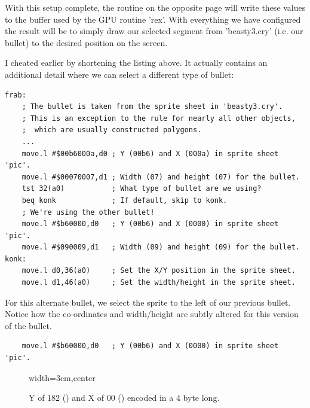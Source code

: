 With this setup complete, the routine  on the opposite page will write these
values to the buffer used by the GPU routine 'rex'. With everything we have configured the result
will be to simply draw our selected segment from 'beasty3.cry' (i.e. our bullet) to the desired position on the screen.

I cheated earlier by shortening the  listing above. It actually contains an additional detail
where we can select a different type of bullet:
\begin{lstlisting}
frab:
    ; The bullet is taken from the sprite sheet in 'beasty3.cry'.
    ; This is an exception to the rule for nearly all other objects,
    ;  which are usually constructed polygons.
    ...
    move.l #$00b6000a,d0 ; Y (00b6) and X (000a) in sprite sheet 'pic'.
    move.l #$00070007,d1 ; Width (07) and height (07) for the bullet.
    tst 32(a0)           ; What type of bullet are we using?
    beq konk             ; If default, skip to konk.
    ; We're using the other bullet!
    move.l #$b60000,d0   ; Y (00b6) and X (0000) in sprite sheet 'pic'.
    move.l #$090009,d1   ; Width (09) and height (09) for the bullet.
konk:
    move.l d0,36(a0)     ; Set the X/Y position in the sprite sheet.
    move.l d1,46(a0)     ; Set the width/height in the sprite sheet.
\end{lstlisting}

For this alternate bullet, we select the sprite to the left of our previous bullet. Notice how the co-ordinates
and width/height are subtly altered for this version of the bullet.
\begin{lstlisting}
    move.l #$b60000,d0   ; Y (00b6) and X (0000) in sprite sheet 'pic'.
\end{lstlisting}
\begin{figure}[H]
  {
    \setlength{\tabcolsep}{3.0pt}
    \setlength\cmidrulewidth{\lightrulewidth} %
    \begin{adjustbox}{width=3cm,center}
    \end{adjustbox}
  \caption*{Y of 182 () and X of 00 () encoded in a 4 byte long.}
  }
\end{figure}

